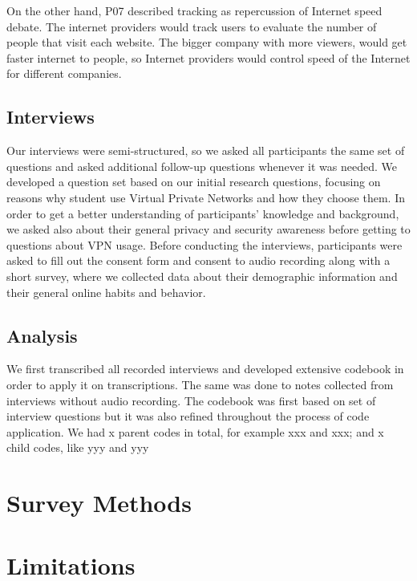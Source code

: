 On the other hand, P07 described tracking as repercussion of Internet speed debate. The internet providers would track users to evaluate the number of people that visit each website. The bigger company with more viewers, would get faster internet to people, so Internet providers would control speed of the Internet for different companies. 



\subsection{Interviews}
Our interviews were semi-structured, so we asked all participants the same set of questions and asked additional follow-up questions whenever it was needed. We developed a question set based on our initial research questions, focusing on reasons why student use Virtual Private Networks and how they choose them. In order to get a better understanding of participants’ knowledge and background, we asked also about their general privacy and security awareness before getting to questions about VPN usage. 
Before conducting the interviews, participants were asked to fill out the consent form and consent to audio recording along with a short survey, where we collected data about their demographic information and their general online habits and behavior. 

\subsection{Analysis}
We first transcribed all recorded interviews and developed extensive codebook in order to apply it on transcriptions. The same was done to notes collected from interviews without audio recording. The codebook was first based on set of interview questions but it was also refined throughout the process of code application. We had x parent codes in total, for example xxx and xxx; and x child codes, like yyy and yyy

\section{Survey Methods}

\section{Limitations}